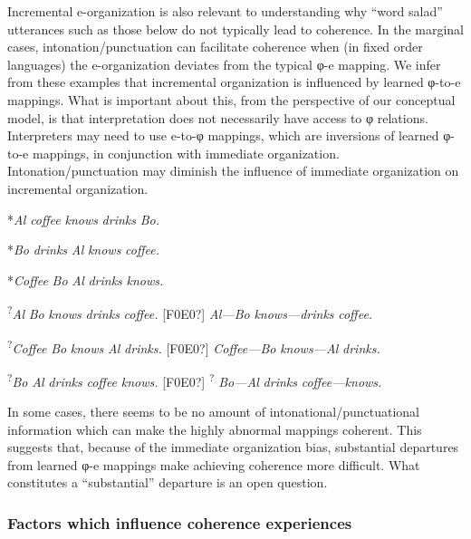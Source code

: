   Incremental e-organization is also relevant to understanding why “word salad” utterances such as those below do not typically lead to coherence. In the marginal cases, intonation/punctuation can facilitate coherence when (in fixed order languages) the e-organization deviates from the typical φ-e mapping. We infer from these examples that incremental organization is influenced by learned φ-to-e mappings. What is important about this, from the perspective of our conceptual model, is that interpretation does not necessarily have access to φ relations. Interpreters may need to use e-to-φ mappings, which are inversions of learned φ-to-e mappings, in conjunction with immediate organization. Intonation/punctuation may diminish the influence of immediate organization on incremental organization. 

    *\textit{Al} \textit{coffee} \textit{knows} \textit{drinks} \textit{Bo.}  

    *\textit{Bo} \textit{drinks} \textit{Al} \textit{knows} \textit{coffee.}

    *\textit{Coffee} \textit{Bo} \textit{Al} \textit{drinks} \textit{knows.}

    \textsuperscript{?}\textit{Al} \textit{Bo} \textit{knows} \textit{drinks} \textit{coffee.}   [F0E0?]   \textit{Al—Bo} \textit{knows—drinks} \textit{coffee.}

    \textsuperscript{?}\textit{Coffee} \textit{Bo} \textit{knows} \textit{Al} \textit{drinks.}   [F0E0?]  \textit{Coffee—Bo} \textit{knows—Al} \textit{drinks.}

    \textsuperscript{?}\textit{Bo} \textit{Al} \textit{drinks} \textit{coffee} \textit{knows.}  [F0E0?]  \textsuperscript{?} \textit{Bo—Al} \textit{drinks} \textit{coffee—knows.}

  In some cases, there seems to be no amount of intonational/punctuational information which can make the highly abnormal mappings coherent. This suggests that, because of the immediate organization bias, substantial departures from learned φ-e mappings make achieving coherence more difficult. What constitutes a “substantial” departure is an open question.

\subsubsection{Factors which influence coherence experiences}

